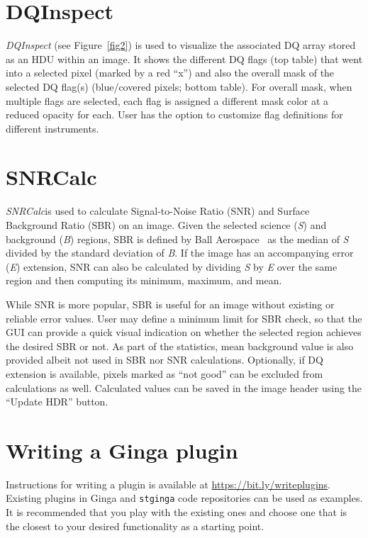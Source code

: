 \documentclass[11pt,twoside]{article}
\begin{document}
\section{DQInspect}

{\em DQInspect} (see Figure~\ref{fig2}) is used to visualize the associated DQ
array stored as an HDU within an image.
It shows the different DQ flags (top table) that went into a selected pixel
(marked by a red ``x'')
and also the overall mask of the selected DQ flag(s)
(blue/covered pixels; bottom table).
For overall mask, when multiple flags are selected, each flag is assigned a
different mask color at a reduced opacity for each.
User has the option to customize flag definitions for different instruments.


\section{SNRCalc}

{\em SNRCalc}\footnotemark[3] is used to calculate Signal-to-Noise Ratio
(SNR) and Surface Background Ratio (SBR) on an image.
Given the selected science ({\em S}) and background ({\em B}) regions,
SBR is defined by Ball Aerospace~\citep{sbr} as the median of {\em S}
divided by the standard deviation of {\em B}.
If the image has an accompanying error ({\em E}) extension, SNR can also
be calculated by dividing {\em S} by {\em E} over the same region and
then computing its minimum, maximum, and mean.

While SNR is more popular, SBR is useful for an image without existing or
reliable error values. User may define a minimum limit for SBR check,
so that the GUI can provide a quick visual indication on whether the
selected region achieves the desired SBR or not.
As part of the statistics, mean background value is also
provided albeit not used in SBR nor SNR calculations.
Optionally, if DQ extension is available, pixels marked as
``not good'' can be excluded from calculations as well.
Calculated values can be saved in the image header using the ``Update HDR''
button.\footnotemark[4]

\section{Writing a Ginga plugin}

Instructions for writing a plugin is available at
\url{https://bit.ly/writeplugins}.
Existing plugins in Ginga and {\tt stginga} code repositories can be used as
examples. It is recommended that you play with the existing ones and
choose one that is the closest to your desired functionality as a
starting point.
\end{document}
